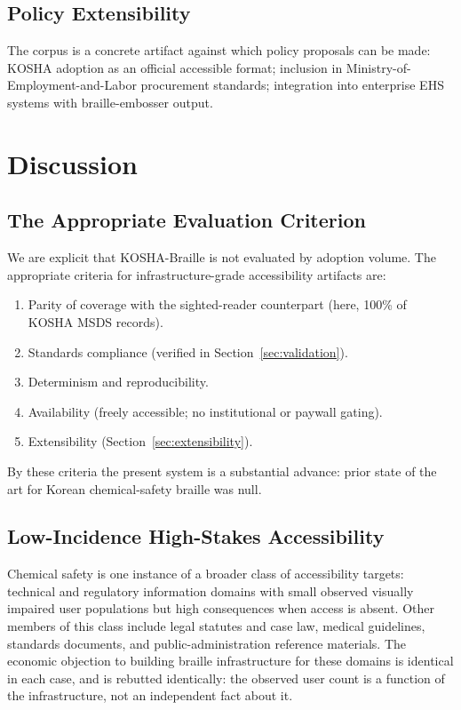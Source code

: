 \documentclass[journal]{IEEEtran}
\begin{document}
\subsection{Policy Extensibility}

The corpus is a concrete artifact against which policy proposals can be made: KOSHA adoption as an official accessible format; inclusion in Ministry-of-Employment-and-Labor procurement standards; integration into enterprise EHS systems with braille-embosser output.

\section{Discussion}
\label{sec:discussion}

\subsection{The Appropriate Evaluation Criterion}

We are explicit that KOSHA-Braille is not evaluated by adoption volume. The appropriate criteria for infrastructure-grade accessibility artifacts are:

\begin{enumerate}
\item Parity of coverage with the sighted-reader counterpart (here, 100\% of KOSHA MSDS records).
\item Standards compliance (verified in Section~\ref{sec:validation}).
\item Determinism and reproducibility.
\item Availability (freely accessible; no institutional or paywall gating).
\item Extensibility (Section~\ref{sec:extensibility}).
\end{enumerate}

By these criteria the present system is a substantial advance: prior state of the art for Korean chemical-safety braille was null.

\subsection{Low-Incidence High-Stakes Accessibility}

Chemical safety is one instance of a broader class of accessibility targets: technical and regulatory information domains with small observed visually impaired user populations but high consequences when access is absent. Other members of this class include legal statutes and case law, medical guidelines, standards documents, and public-administration reference materials. The economic objection to building braille infrastructure for these domains is identical in each case, and is rebutted identically: the observed user count is a function of the infrastructure, not an independent fact about it.
\end{document}
